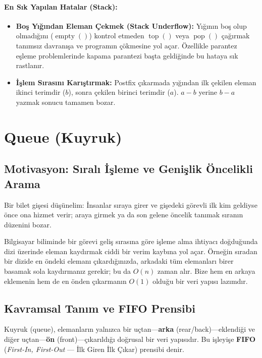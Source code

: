 \paragraph{En Sık Yapılan Hatalar (Stack):}
\begin{itemize}
    \item \textbf{Boş Yığından Eleman Çekmek (Stack Underflow):} Yığının boş olup olmadığını ($\operatorname{empty}()$) kontrol etmeden $\operatorname{top}()$ veya $\operatorname{pop}()$ çağırmak tanımsız davranışa ve programın çökmesine yol açar. Özellikle parantez eşleme problemlerinde kapama parantezi başta geldiğinde bu hataya sık rastlanır.
    \item \textbf{İşlem Sırasını Karıştırmak:} Postfix çıkarmada yığından ilk çekilen eleman ikinci terimdir ($b$), sonra çekilen birinci terimdir ($a$). $a - b$ yerine $b - a$ yazmak sonucu tamamen bozar.
\end{itemize}

\section{Queue (Kuyruk)}

\subsection{Motivasyon: Sıralı İşleme ve Genişlik Öncelikli Arama}
Bir bilet gişesi düşünelim: İnsanlar sıraya girer ve gişedeki görevli ilk kim geldiyse önce ona hizmet verir; araya girmek ya da son gelene öncelik tanımak sıranın düzenini bozar.

Bilgisayar biliminde bir görevi geliş sırasına göre işleme alma ihtiyacı doğduğunda dizi üzerinde eleman kaydırmak ciddi bir verim kaybına yol açar. Örneğin sıradan bir dizide en öndeki elemanı çıkardığınızda, arkadaki tüm elemanları birer basamak sola kaydırmanız gerekir; bu da $O(n)$ zaman alır. Bize hem en arkaya eklemenin hem de en önden çıkarmanın $O(1)$ olduğu bir veri yapısı lazımdır.

\subsection{Kavramsal Tanım ve FIFO Prensibi}

\begin{definition}
Kuyruk (queue), elemanların yalnızca bir uçtan—\textbf{arka} (rear/back)—eklendiği ve diğer uçtan—\textbf{ön} (front)—çıkarıldığı doğrusal bir veri yapısıdır. Bu işleyişe \textbf{FIFO} (\emph{First-In, First-Out} — İlk Giren İlk Çıkar) prensibi denir.
\end{definition}

